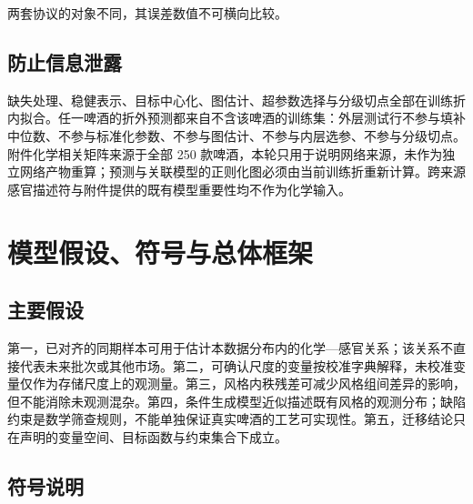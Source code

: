 \documentclass[11pt,a4paper]{article}
\begin{document}
两套协议的对象不同，其误差数值不可横向比较。

\subsection{防止信息泄露}\label{ux9632ux6b62ux4fe1ux606fux6cc4ux9732}

缺失处理、稳健表示、目标中心化、图估计、超参数选择与分级切点全部在训练折内拟合。任一啤酒的折外预测都来自不含该啤酒的训练集：外层测试行不参与填补中位数、不参与标准化参数、不参与图估计、不参与内层选参、不参与分级切点。附件化学相关矩阵来源于全部
250
款啤酒，本轮只用于说明网络来源，未作为独立网络产物重算；预测与关联模型的正则化图必须由当前训练折重新计算。跨来源感官描述符与附件提供的既有模型重要性均不作为化学输入。

\section{模型假设、符号与总体框架}\label{ux6a21ux578bux5047ux8bbeux7b26ux53f7ux4e0eux603bux4f53ux6846ux67b6}

\subsection{主要假设}\label{ux4e3bux8981ux5047ux8bbe}

第一，已对齐的同期样本可用于估计本数据分布内的化学---感官关系；该关系不直接代表未来批次或其他市场。第二，可确认尺度的变量按校准字典解释，未校准变量仅作为存储尺度上的观测量。第三，风格内秩残差可减少风格组间差异的影响，但不能消除未观测混杂。第四，条件生成模型近似描述既有风格的观测分布；缺陷约束是数学筛查规则，不能单独保证真实啤酒的工艺可实现性。第五，迁移结论只在声明的变量空间、目标函数与约束集合下成立。

\subsection{符号说明}\label{ux7b26ux53f7ux8bf4ux660e}
\end{document}
